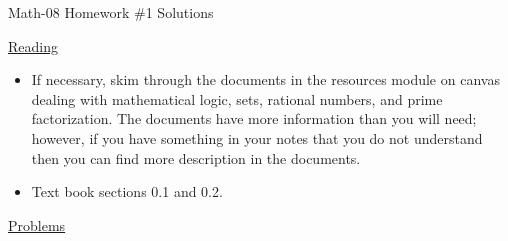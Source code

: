 \documentclass[letterpaper,12pt,fleqn]{article}
\begin{document}
\begin{center}
\Large Math-08 Homework \#1 Solutions
\end{center}

\vspace{0.5in}

\underline{Reading}

\begin{itemize}
\item If necessary, skim through the documents in the resources module on
  canvas dealing with mathematical logic, sets, rational numbers, and prime
  factorization. The documents have more information than you will need;
  however, if you have something in your notes that you do not understand then
  you can find more description in the documents.
\item Text book sections 0.1 and 0.2.
\end{itemize}

\underline{Problems}
\end{document}
